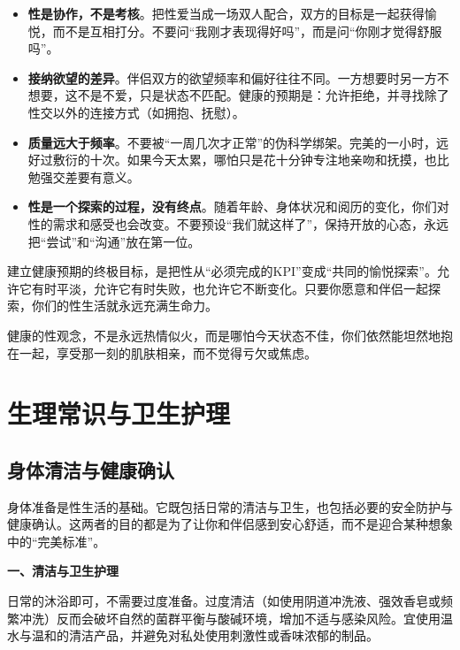 \documentclass[12pt,UTF8]{ctexbook}
\begin{document}
\begin{itemize}
\item \textbf{性是协作，不是考核}。把性爱当成一场双人配合，双方的目标是一起获得愉悦，而不是互相打分。不要问“我刚才表现得好吗”，而是问“你刚才觉得舒服吗”。
\item \textbf{接纳欲望的差异}。伴侣双方的欲望频率和偏好往往不同。一方想要时另一方不想要，这不是不爱，只是状态不匹配。健康的预期是：允许拒绝，并寻找除了性交以外的连接方式（如拥抱、抚慰）。
\item \textbf{质量远大于频率}。不要被“一周几次才正常”的伪科学绑架。完美的一小时，远好过敷衍的十次。如果今天太累，哪怕只是花十分钟专注地亲吻和抚摸，也比勉强交差要有意义。
\item \textbf{性是一个探索的过程，没有终点}。随着年龄、身体状况和阅历的变化，你们对性的需求和感受也会改变。不要预设“我们就这样了”，保持开放的心态，永远把“尝试”和“沟通”放在第一位。
\end{itemize}

建立健康预期的终极目标，是把性从“必须完成的KPI”变成“共同的愉悦探索”。允许它有时平淡，允许它有时失败，也允许它不断变化。只要你愿意和伴侣一起探索，你们的性生活就永远充满生命力。

\begin{tcolorbox}[colback=pink!5!white,colframe=red!50!black,title=贴心小叮咛]
健康的性观念，不是永远热情似火，而是哪怕今天状态不佳，你们依然能坦然地抱在一起，享受那一刻的肌肤相亲，而不觉得亏欠或焦虑。
\end{tcolorbox}

\section{生理常识与卫生护理}

\subsection{身体清洁与健康确认}

身体准备是性生活的基础。它既包括日常的清洁与卫生，也包括必要的安全防护与健康确认。这两者的目的都是为了让你和伴侣感到安心舒适，而不是迎合某种想象中的“完美标准”。

\textbf{一、清洁与卫生护理}

日常的沐浴即可，不需要过度准备。过度清洁（如使用阴道冲洗液、强效香皂或频繁冲洗）反而会破坏自然的菌群平衡与酸碱环境，增加不适与感染风险。宜使用温水与温和的清洁产品，并避免对私处使用刺激性或香味浓郁的制品。
\end{document}
